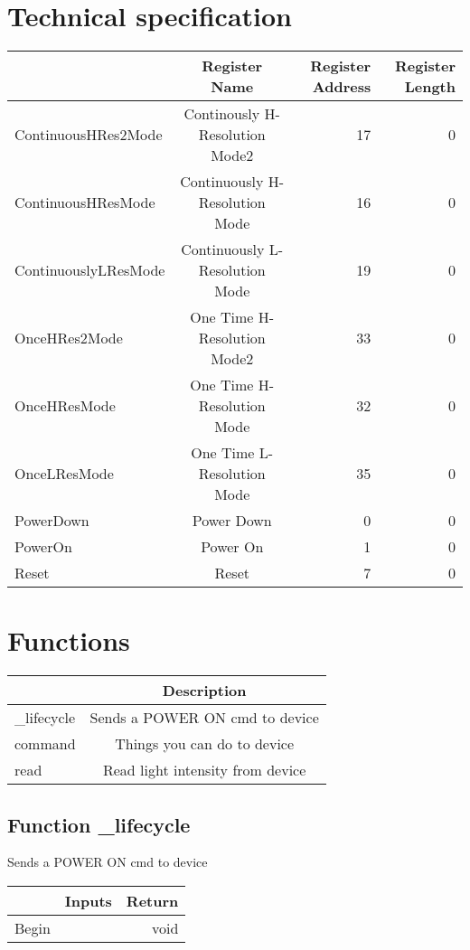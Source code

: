 \documentclass[a4paper,12pt,oneside,pdflatex,italian,final,twocolumn]{article}
\begin{document}
\section{Technical specification}
\centering
\begin{tabular}{lcrr}
\toprule
 & Register Name & Register Address & Register Length \\
\midrule
ContinuousHRes2Mode & Continously H-Resolution Mode2 & 17 & 0 \\
ContinuousHResMode & Continuously H-Resolution Mode & 16 & 0 \\
ContinuouslyLResMode & Continuously L-Resolution Mode & 19 & 0 \\
OnceHRes2Mode & One Time H-Resolution Mode2 & 33 & 0 \\
OnceHResMode & One Time H-Resolution Mode & 32 & 0 \\
OnceLResMode & One Time L-Resolution Mode & 35 & 0 \\
PowerDown & Power Down & 0 & 0 \\
PowerOn & Power On & 1 & 0 \\
Reset & Reset & 7 & 0 \\
\bottomrule
\end{tabular}


\raggedright

\section{Functions}

\centering
\begin{tabular}{lc}
\toprule
  & Description \\
\midrule
_lifecycle & Sends a POWER ON cmd to device \\
command & Things you can do to device \\
read & Read light intensity from device \\
\bottomrule
\end{tabular}


\raggedright
\subsection{Function _lifecycle }
Sends a POWER ON cmd to device \\

\centering
\begin{tabular}{lcr}
\toprule
  & Inputs & Return \\
\midrule
Begin &
&
void
\\
\bottomrule
\end{tabular}
\end{document}
